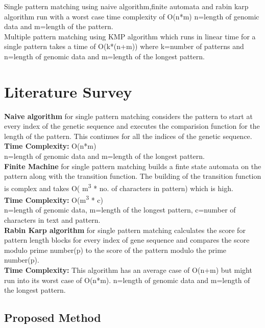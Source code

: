 \documentclass[a4paper,11pt,twocolumn]{article}
\begin{document}
Single pattern matching using naive algorithm,finite automata and rabin karp algorithm run with a worst case time complexity of O(n*m) n=length of genomic data and m=length of the pattern.  \\

Multiple pattern matching using KMP algorithm which runs in linear time for a single pattern takes a time of O(k*(n+m)) where k=number of patterns and n=length of genomic data and m=length of the longest pattern. 

\section{Literature Survey}
\textbf{Naive algorithm} for single pattern matching considers the pattern to start at every index of the genetic sequence and executes the comparision function for the length of the pattern. This continues for all the indices of the genetic sequence.\\

\textbf{Time Complexity:} O(n*m)\\

n=length of genomic data and m=length of the longest pattern.
\\

\textbf{Finite Machine} for single pattern matching builds a finte state automata on the pattern along with the transition function. The building of the transition function is complex and takes O( m\textsuperscript{3} * no. of characters in pattern) which is high.\\

\textbf{Time Complexity:} O(m\textsuperscript{3} * c)\\

n=length of genomic data, m=length of the longest pattern, c=number of characters in text and pattern.\\

\textbf{Rabin Karp algorithm }for single pattern matching calculates the score for pattern length blocks for every index of gene sequence and compares the score modulo prime number(p) to the score of the pattern  modulo the prime number(p).\\
 
\textbf{Time Complexity: }This algorithm has an average case of O(n+m) but might run into its worst case of O(n*m).
n=length of genomic data and m=length of the longest pattern.

\subsection{Proposed Method}
\end{document}
